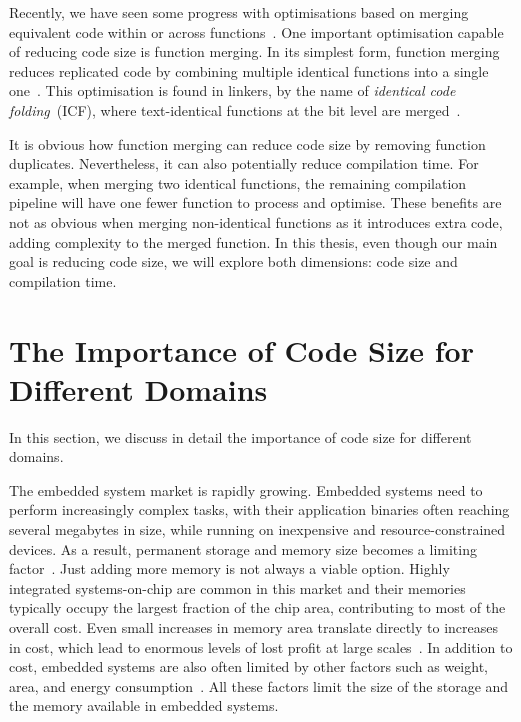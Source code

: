 Recently, we have seen some progress with optimisations based on merging equivalent code within or across functions~\cite{edler14,chabbi21}.
One important optimisation capable of reducing code size is function merging.
In its simplest form, function merging reduces replicated code by combining multiple identical functions into a single one~\cite{llvm-fm,livska14}.
This optimisation is found in linkers, by the name of \textit{identical code folding}~(ICF), where text-identical functions at the bit level are merged~\cite{tallam10,kwan12,msvc-icf}.

It is obvious how function merging can reduce code size by removing function duplicates.
Nevertheless, it can also potentially reduce compilation time.
For example, when merging two identical functions, the remaining compilation pipeline will have one fewer function to process and optimise.
These benefits are not as obvious when merging non-identical functions as it introduces extra code, adding complexity to the merged function.
In this thesis, even though our main goal is reducing code size, we will explore both dimensions: code size and compilation time.

\section{The Importance of Code Size for Different Domains}

In this section, we discuss in detail the importance of code size for different domains.

The embedded system market is rapidly growing.
Embedded systems need to perform increasingly complex tasks, with their application binaries often reaching several megabytes in size, while running on inexpensive and resource-constrained devices.
As a result, permanent storage and memory size becomes a limiting factor~\cite{plaza18}.
Just adding more memory is not always a viable option.
Highly integrated systems-on-chip are common in this market and their memories typically occupy the largest fraction of the chip area, contributing to most of the overall cost.
Even small increases in memory area translate directly to increases in cost, which lead to enormous levels of lost profit at large scales~\cite{edler10}.
In addition to cost, embedded systems are also often limited by other factors such as weight, area, and energy consumption~\cite{tiggeler00,edwards20}.
All these factors limit the size of the storage and the memory available in embedded systems. 

